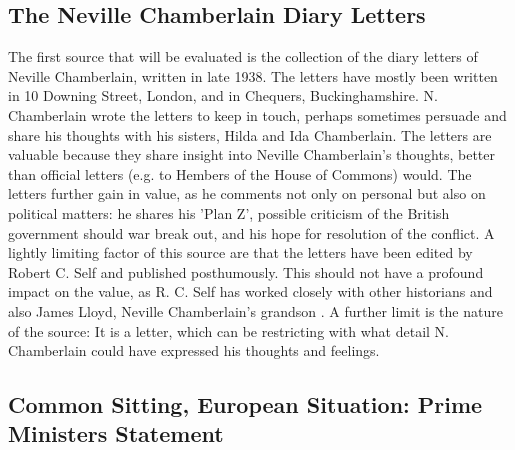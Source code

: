 \documentclass[10pt, a4papert, hidelinks]{article}
\begin{document}
\subsection{The Neville Chamberlain Diary Letters} %


The first source that will be evaluated is the collection of the diary letters of Neville Chamberlain, written in late 1938. The letters have mostly been written in 10 Downing Street, London, and in Chequers, Buckinghamshire. N. Chamberlain wrote the letters to keep in touch, perhaps sometimes persuade and share his thoughts with his sisters, Hilda and Ida Chamberlain. The letters are valuable because they share insight into Neville Chamberlain's thoughts, better than official letters (e.g. to Hembers of the House of Commons) would. The letters further gain in value, as he comments not only on personal but also on political matters: he shares his 'Plan Z', possible criticism of the British government should war break out, and his hope for resolution of the conflict. A lightly limiting factor of this source are that the letters have been edited by Robert C. Self and published posthumously. This should not have a profound impact on the value, as R. C. Self has worked closely with other historians and also James Lloyd, Neville Chamberlain's grandson \cite{chamberlain_neville_2000}. A further limit is the nature of the source: It is a letter, which can be restricting with what detail N. Chamberlain could have expressed his thoughts and feelings.

\subsection{Common Sitting, European Situation: Prime Ministers Statement} %

\end{document}
